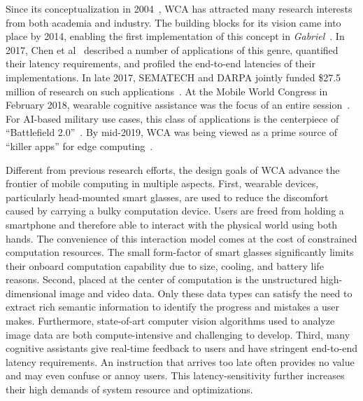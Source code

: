 Since its conceptualization in 2004~\cite{Satya2004}, WCA has attracted many
research interests from both academia and industry. The building blocks for its
vision came into place by 2014, enabling the first implementation of this
concept in {\em Gabriel}~\cite{ha2014towards}. In 2017, Chen et
al~\cite{chen2017empirical} described a number of applications of this genre,
quantified their latency requirements, and profiled the end-to-end latencies of
their implementations. In late 2017, SEMATECH and DARPA jointly funded \$27.5
million of research on such applications~\cite{Oakley2018, Stokes2018}.  At the
Mobile World Congress in February 2018, wearable cognitive assistance was the
focus of an entire session~\cite{Ray2018}.  For AI-based military use cases,
this class of applications is the centerpiece of ``Battlefield
2.0''~\cite{Doffman2018}. By mid-2019, WCA was being viewed as a prime source of
``killer apps'' for edge computing~\cite{Satya2019b,Satya2019c}.


Different from previous research efforts, the design goals of WCA advance the
frontier of mobile computing in multiple aspects. First, wearable devices,
particularly head-mounted smart glasses, are used to reduce the discomfort
caused by carrying a bulky computation device. Users are freed from holding a
smartphone and therefore able to interact with the physical world using both
hands. The convenience of this interaction model comes at the cost of
constrained computation resources. The small form-factor of smart glasses
significantly limits their onboard computation capability due to size, cooling,
and battery life reasons. Second, placed at the center of computation is the
unstructured high-dimensional image and video data. Only these data types can
satisfy the need to extract rich semantic information to identify the progress
and mistakes a user makes. Furthermore, state-of-art computer vision algorithms
used to analyze image data are both compute-intensive and challenging to
develop. Third, many cognitive assistants give real-time feedback to users and
have stringent end-to-end latency requirements. An instruction that arrives too
late often provides no value and may even confuse or annoy users. This
latency-sensitivity further increases their high demands of system resource and
optimizations.

